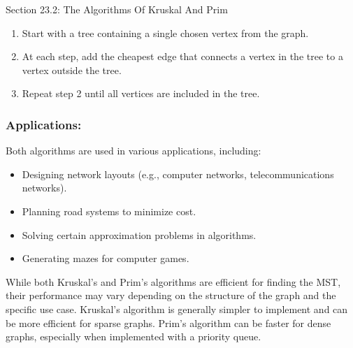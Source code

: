 \begin{notes}{Section 23.2: The Algorithms Of Kruskal And Prim}
    \begin{enumerate}
        \item Start with a tree containing a single chosen vertex from the graph.
        \item At each step, add the cheapest edge that connects a vertex in the tree to a vertex outside the tree.
        \item Repeat step 2 until all vertices are included in the tree.
    \end{enumerate}
    
    \subsubsection*{Applications:}

    Both algorithms are used in various applications, including:

    \begin{itemize}
        \item Designing network layouts (e.g., computer networks, telecommunications networks).
        \item Planning road systems to minimize cost.
        \item Solving certain approximation problems in algorithms.
        \item Generating mazes for computer games.
    \end{itemize}
    
    \begin{highlight}[Comparison]
    While both Kruskal's and Prim's algorithms are efficient for finding the MST, their performance may vary depending on the structure of the graph and the specific use case. Kruskal's algorithm is 
    generally simpler to implement and can be more efficient for sparse graphs. Prim's algorithm can be faster for dense graphs, especially when implemented with a priority queue.
    \end{highlight}    
\end{notes}